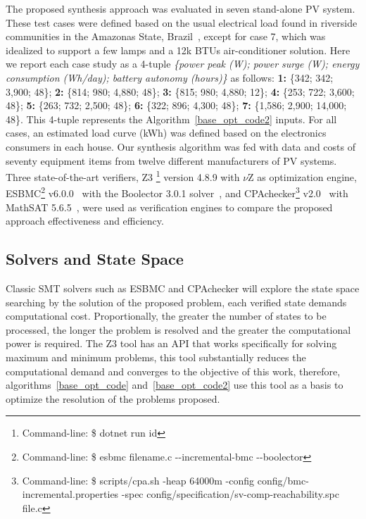 \documentclass[10pt,journal,compsoc]{IEEEtran}
\begin{document}
The proposed synthesis approach was evaluated in seven stand-alone PV system. These test cases were defined based on the usual electrical load found in riverside communities in the Amazonas State, Brazil~\cite{TrindadeCordeiro19,Agrener2013}, except for case 7, which was idealized to support a few lamps and a 12k BTUs air-conditioner solution. 
Here we report each case study as a 4-tuple \textit{\{power peak (W); power surge (W); energy consumption (Wh/day); battery autonomy (hours)\}} as follows:
\color{blue}\textbf{1:} \{342; 342; 3,900; 48\}; \textbf{2:} \{814; 980; 4,880; 48\}; \textbf{3:} \{815; 980; 4,880; 12\}; \textbf{4:} \{253; 722; 3,600; 48\}; \textbf{5:} \{263; 732; 2,500; 48\}; \textbf{6:} \{322; 896; 4,300; 48\}; \textbf{7:} \{1,586; 2,900; 14,000; 48\}. This 4-tuple represents the Algorithm~\ref{base_opt_code2} inputs. For all cases, an estimated load curve (kWh) was defined based on the electronics consumers in each house. Our synthesis algorithm was fed with data and costs of seventy equipment items from twelve different manufacturers of PV systems. 
%
Three state-of-the-art verifiers, Z3 \footnote{Command-line: \$ dotnet run id} version 4.8.9 with $\nu$Z as optimization engine, ESBMC\footnote{Command-line: \$ esbmc filename.c -\phantom{}-incremental-bmc -\phantom{}-boolector} v6.0.0~\cite{esbmc2018} with the Boolector 3.0.1 solver~\cite{Brummayer}, and CPAchecker\footnote{Command-line: \$ scripts/cpa.sh -heap 64000m -config config/bmc-incremental.properties -spec config/specification/sv-comp-reachability.spc file.c} v2.0~\cite{Beyer2011} with MathSAT 5.6.5~\cite{mathsat5}, were used as verification engines to compare the proposed approach effectiveness and efficiency.  \color{black}

\subsection{Solvers and State Space}
\label{sec:SolversandStateSpace}
\color{blue}Classic SMT solvers such as ESBMC and CPAchecker will explore the state space searching by the solution of the proposed problem, each verified state demands computational cost. Proportionally, the greater the number of states to be processed, the longer the problem is resolved and the greater the computational power is required. The Z3 tool has an API that works specifically for solving maximum and minimum problems, this tool substantially reduces the computational demand and converges to the objective of this work, therefore, algorithms~\ref{base_opt_code} and~\ref{base_opt_code2} use this tool as a basis to optimize the resolution of the problems proposed.
\end{document}
